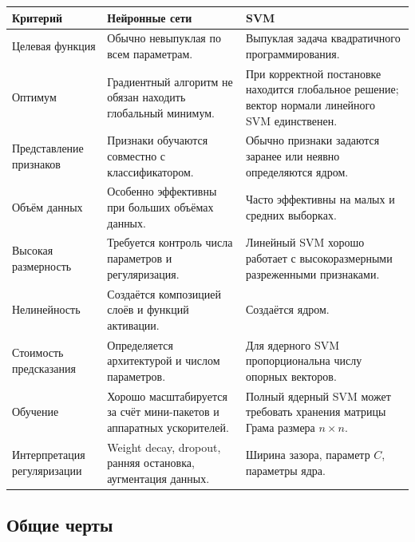 \documentclass[12pt,a4paper]{article}
\theoremstyle{definition}
\newcommand{\1}{\mathbf{1}}
\begin{document}
\begin{center}
\begin{longtable}{p{3.4cm} p{5.6cm} p{5.6cm}}
\toprule
\textbf{Критерий}
&
\textbf{Нейронные сети}
&
\textbf{SVM}
\\
\midrule

Целевая функция
&
Обычно невыпуклая по всем параметрам.
&
Выпуклая задача квадратичного программирования.
\\
\midrule

Оптимум
&
Градиентный алгоритм не обязан находить глобальный минимум.
&
При корректной постановке находится глобальное решение; вектор
нормали линейного SVM единственен.
\\
\midrule

Представление признаков
&
Признаки обучаются совместно с классификатором.
&
Обычно признаки задаются заранее или неявно определяются ядром.
\\
\midrule

Объём данных
&
Особенно эффективны при больших объёмах данных.
&
Часто эффективны на малых и средних выборках.
\\
\midrule

Высокая размерность
&
Требуется контроль числа параметров и регуляризация.
&
Линейный SVM хорошо работает с высокоразмерными разреженными
признаками.
\\
\midrule

Нелинейность
&
Создаётся композицией слоёв и функций активации.
&
Создаётся ядром.
\\
\midrule

Стоимость предсказания
&
Определяется архитектурой и числом параметров.
&
Для ядерного SVM пропорциональна числу опорных векторов.
\\
\midrule

Обучение
&
Хорошо масштабируется за счёт мини-пакетов и аппаратных ускорителей.
&
Полный ядерный SVM может требовать хранения матрицы Грама размера
$n\times n$.
\\
\midrule

Интерпретация регуляризации
&
Weight decay, dropout, ранняя остановка, аугментация данных.
&
Ширина зазора, параметр $C$, параметры ядра.
\\
\bottomrule
\end{longtable}
\end{center}

\subsection{Общие черты}
\end{document}
